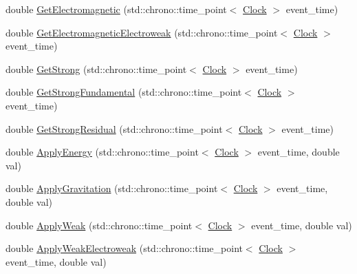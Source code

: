 \begin{DoxyCompactItemize}
\item 
double \mbox{\hyperlink{classElementaryForce_a2c8bc3226f42710717775c73eee1644e}{Get\+Electromagnetic}} (std\+::chrono\+::time\+\_\+point$<$ \mbox{\hyperlink{universe_8h_a0ef8d951d1ca5ab3cfaf7ab4c7a6fd80}{Clock}} $>$ event\+\_\+time)
\item 
double \mbox{\hyperlink{classElementaryForce_a58e503f2f3a7410f034a2a04bca560d1}{Get\+Electromagnetic\+Electroweak}} (std\+::chrono\+::time\+\_\+point$<$ \mbox{\hyperlink{universe_8h_a0ef8d951d1ca5ab3cfaf7ab4c7a6fd80}{Clock}} $>$ event\+\_\+time)
\item 
double \mbox{\hyperlink{classElementaryForce_aaa1cde27b1508831f67353eb39745a7e}{Get\+Strong}} (std\+::chrono\+::time\+\_\+point$<$ \mbox{\hyperlink{universe_8h_a0ef8d951d1ca5ab3cfaf7ab4c7a6fd80}{Clock}} $>$ event\+\_\+time)
\item 
double \mbox{\hyperlink{classElementaryForce_a0974d6537c07dac2453d2a607324fa21}{Get\+Strong\+Fundamental}} (std\+::chrono\+::time\+\_\+point$<$ \mbox{\hyperlink{universe_8h_a0ef8d951d1ca5ab3cfaf7ab4c7a6fd80}{Clock}} $>$ event\+\_\+time)
\item 
double \mbox{\hyperlink{classElementaryForce_a3478c8ad35bce240055da7d4a03e555e}{Get\+Strong\+Residual}} (std\+::chrono\+::time\+\_\+point$<$ \mbox{\hyperlink{universe_8h_a0ef8d951d1ca5ab3cfaf7ab4c7a6fd80}{Clock}} $>$ event\+\_\+time)
\item 
double \mbox{\hyperlink{classElementaryForce_a0961328b260cb4dfb2ba54f4e284f0e8}{Apply\+Energy}} (std\+::chrono\+::time\+\_\+point$<$ \mbox{\hyperlink{universe_8h_a0ef8d951d1ca5ab3cfaf7ab4c7a6fd80}{Clock}} $>$ event\+\_\+time, double val)
\item 
double \mbox{\hyperlink{classElementaryForce_a655a2c9489bfbbf15e05ba4953628134}{Apply\+Gravitation}} (std\+::chrono\+::time\+\_\+point$<$ \mbox{\hyperlink{universe_8h_a0ef8d951d1ca5ab3cfaf7ab4c7a6fd80}{Clock}} $>$ event\+\_\+time, double val)
\item 
double \mbox{\hyperlink{classElementaryForce_aabf66a859e6e808a65c6929cd16f7597}{Apply\+Weak}} (std\+::chrono\+::time\+\_\+point$<$ \mbox{\hyperlink{universe_8h_a0ef8d951d1ca5ab3cfaf7ab4c7a6fd80}{Clock}} $>$ event\+\_\+time, double val)
\item 
double \mbox{\hyperlink{classElementaryForce_a2d3a5444c771f35d66d4151c62f53b12}{Apply\+Weak\+Electroweak}} (std\+::chrono\+::time\+\_\+point$<$ \mbox{\hyperlink{universe_8h_a0ef8d951d1ca5ab3cfaf7ab4c7a6fd80}{Clock}} $>$ event\+\_\+time, double val)
\item 

\end{DoxyCompactItemize}
